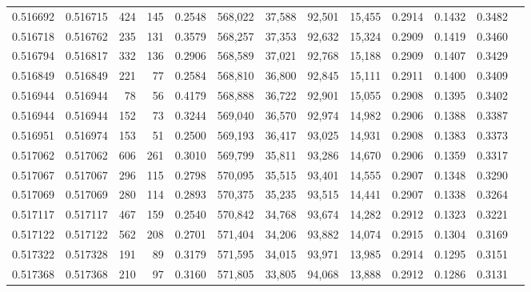 \begin{tabular}{rrrrrrrrrrrrr}
0.516692 & 0.516715 &   424 &   145 &                                     0.2548 & 568,022 &  37,588 &  92,501 &  15,455 & 0.2914 & 0.1432 & 0.3482 \\
0.516718 & 0.516762 &   235 &   131 &                                     0.3579 & 568,257 &  37,353 &  92,632 &  15,324 & 0.2909 & 0.1419 & 0.3460 \\
0.516794 & 0.516817 &   332 &   136 &                                     0.2906 & 568,589 &  37,021 &  92,768 &  15,188 & 0.2909 & 0.1407 & 0.3429 \\
0.516849 & 0.516849 &   221 &    77 &                                     0.2584 & 568,810 &  36,800 &  92,845 &  15,111 & 0.2911 & 0.1400 & 0.3409 \\
0.516944 & 0.516944 &    78 &    56 &                                     0.4179 & 568,888 &  36,722 &  92,901 &  15,055 & 0.2908 & 0.1395 & 0.3402 \\
0.516944 & 0.516944 &   152 &    73 &                                     0.3244 & 569,040 &  36,570 &  92,974 &  14,982 & 0.2906 & 0.1388 & 0.3387 \\
0.516951 & 0.516974 &   153 &    51 &                                     0.2500 & 569,193 &  36,417 &  93,025 &  14,931 & 0.2908 & 0.1383 & 0.3373 \\
0.517062 & 0.517062 &   606 &   261 &                                     0.3010 & 569,799 &  35,811 &  93,286 &  14,670 & 0.2906 & 0.1359 & 0.3317 \\
0.517067 & 0.517067 &   296 &   115 &                                     0.2798 & 570,095 &  35,515 &  93,401 &  14,555 & 0.2907 & 0.1348 & 0.3290 \\
0.517069 & 0.517069 &   280 &   114 &                                     0.2893 & 570,375 &  35,235 &  93,515 &  14,441 & 0.2907 & 0.1338 & 0.3264 \\
0.517117 & 0.517117 &   467 &   159 &                                     0.2540 & 570,842 &  34,768 &  93,674 &  14,282 & 0.2912 & 0.1323 & 0.3221 \\
0.517122 & 0.517122 &   562 &   208 &                                     0.2701 & 571,404 &  34,206 &  93,882 &  14,074 & 0.2915 & 0.1304 & 0.3169 \\
0.517322 & 0.517328 &   191 &    89 &                                     0.3179 & 571,595 &  34,015 &  93,971 &  13,985 & 0.2914 & 0.1295 & 0.3151 \\
0.517368 & 0.517368 &   210 &    97 &                                     0.3160 & 571,805 &  33,805 &  94,068 &  13,888 & 0.2912 & 0.1286 & 0.3131 \\

\end{tabular}
